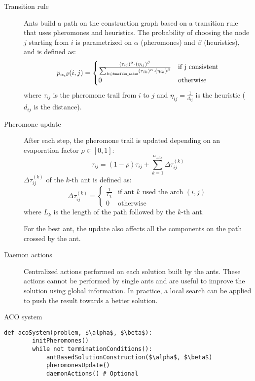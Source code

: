 \begin{description}
    \item[Transition rule] 
        Ants build a path on the construction graph based on a transition rule that uses pheromones and heuristics.
        The probability of choosing the node $j$ starting from $i$ 
        is parametrized on $\alpha$ (pheromones) and $\beta$ (heuristics), and is defined as:
        \[ p_{\alpha, \beta}(i, j) = \begin{cases}
            \frac{(\tau_{ij})^\alpha \cdot (\eta_{ij})^\beta}{\sum_{k \in \texttt{feasible\_nodes}} (\tau_{ik})^\alpha \cdot (\eta_{ik})^\beta} & \text{if } $j$ \text{ consistent} \\
            0 & \text{otherwise}
        \end{cases} \]
        where $\tau_{ij}$ is the pheromone trail from $i$ to $j$ and $\eta_{ij} = \frac{1}{d_{ij}}$ is the heuristic ($d_{ij}$ is the distance).

    \item[Pheromone update]
        After each step, the pheromone trail is updated depending on an evaporation factor $\rho \in [0, 1]$:
        \[ \tau_{ij} = (1 - \rho) \tau_{ij} + \sum_{k=1}^{n_\text{ants}} \Delta \tau_{ij}^{(k)} \]
        $\Delta \tau_{ij}^{(k)}$ of the $k$-th ant is defined as:
        \[ \Delta \tau_{ij}^{(k)} = \begin{cases}
            \frac{1}{L_k} & \text{if ant } k \text{ used the arch } (i, j) \\
            0 & \text{otherwise}
        \end{cases} \]
        where $L_k$ is the length of the path followed by the $k$-th ant.

        For the best ant, the update also affects all the components on the path crossed by the ant.

    \item[Daemon actions]
        Centralized actions performed on each solution built by the ants.
        These actions cannot be performed by single ants and are useful to improve the solution using global information.
        In practice, a local search can be applied to push the result towards a better solution.
\end{description} 

\begin{algorithm}
\caption{ACO system}
\begin{lstlisting}[mathescape=true]
    def acoSystem(problem, $\alpha$, $\beta$):
        initPheromones()
        while not terminationConditions():
            antBasedSolutionConstruction($\alpha$, $\beta$)
            pheromonesUpdate()
            daemonActions() # Optional
\end{lstlisting}
\end{algorithm}



